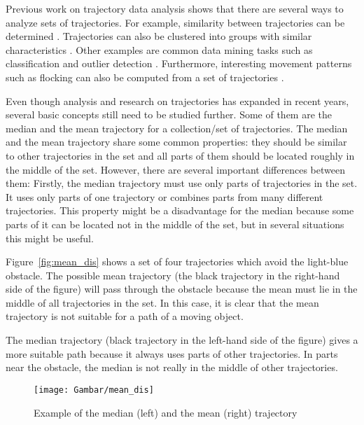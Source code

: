 Previous work on trajectory data analysis shows that there are several ways to analyze sets of trajectories.
For example, similarity between trajectories can be determined \cite{VlachosGunopoulos:2002,Lin:2005,Kreveld:2007}.
Trajectories can also be clustered into groups with similar characteristics \cite{Gaffney:1999,Lee:2007,Nanni:2006,Buchin:2009}.
Other examples are common data mining tasks such as classification \cite{Lee:2008,Garcia:2006} and outlier detection \cite{LeeHan:2008}.
Furthermore, interesting movement patterns such as flocking can also be computed from a set of trajectories \cite{Gudmundsson:2006,Buchin:2008,Gudmundsson:2007,Laube:2006}.

Even though analysis and research on trajectories has expanded in recent years, several basic concepts still need to be studied further.
Some of them are the median and the mean trajectory for a collection/set of trajectories.
The median and the mean trajectory share some common properties: they should be similar to other trajectories in the set and all parts of them should be located roughly in the middle of the set.
However, there are several important differences between them:
Firstly, the median trajectory must use only parts of trajectories in the set. 
It uses only parts of one trajectory or combines parts from many different trajectories.
This property might be a disadvantage for the median because some parts of it can be located not in the middle of the set, but in several situations this might be useful.

Figure~\ref{fig:mean_dis} shows a set of four trajectories which avoid the light-blue obstacle.
The possible mean trajectory (the black trajectory in the right-hand side of the figure) will pass through the obstacle because the mean must lie in the middle of all trajectories in the set.
In this case, it is clear that the mean trajectory is not suitable for a path of a moving object.

The median trajectory (black trajectory in the left-hand side of the figure) gives a more suitable path because it always uses parts of other trajectories.
In parts near the obstacle, the median is not really in the middle of other trajectories.

\begin{figure}
\centering
\texttt{[image: Gambar/mean\_dis]}
\caption[Example of the median (left) and the mean (right) trajectory \cite{Lionov:2009}]{Example of the median (left) and the mean (right) trajectory \cite{Lionov:2009}} 
\end{figure}

